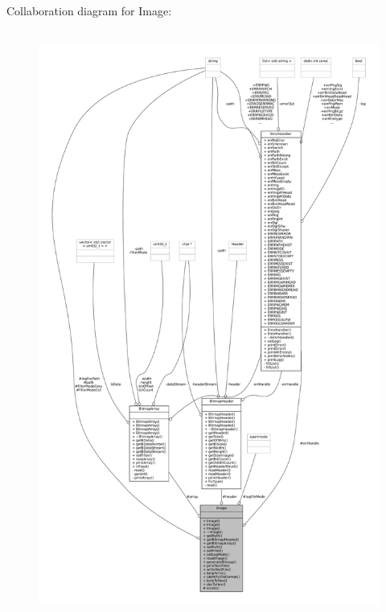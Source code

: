 Collaboration diagram for Image\+:\nopagebreak
\begin{figure}[H]
\begin{center}
\leavevmode
\includegraphics[height=550pt]{classImage__coll__graph}
\end{center}
\end{figure}
